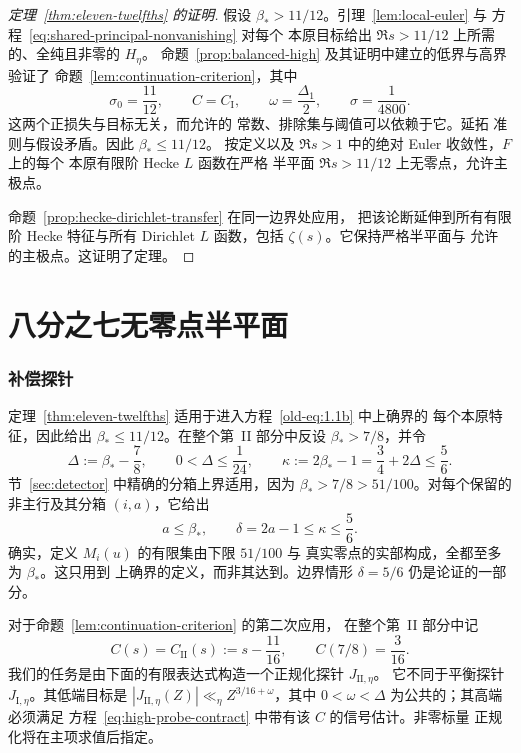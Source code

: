 \documentclass[11pt,a4paper]{article}
\numberwithin{equation}{section}
\numberwithin{figure}{section}
\theoremstyle{definition}
\theoremstyle{remark}
\begin{document}
\begin{proof}[定理~\ref{thm:eleven-twelfths} 的证明]
假设 $\beta_*>11/12$。引理~\ref{lem:local-euler} 与
方程~\eqref{eq:shared-principal-nonvanishing} 对每个
本原目标给出 $\Re s>11/12$ 上所需的、全纯且非零的 $H_\eta$。
命题~\ref{prop:balanced-high} 及其证明中建立的低界与高界验证了
命题~\ref{lem:continuation-criterion}，其中
\[
 \sigma_0=\frac{11}{12},\qquad C=C_{\mathrm I},\qquad
 \omega=\frac{\Delta_1}{2},\qquad \sigma=\frac1{4800}.
\]
这两个正损失与目标无关，而允许的
常数、排除集与阈值可以依赖于它。延拓
准则与假设矛盾。因此 $\beta_*\le11/12$。
按定义以及 $\Re s>1$ 中的绝对 Euler 收敛性，$F$ 上的每个
本原有限阶 Hecke $L$ 函数在严格
半平面 $\Re s>11/12$ 上无零点，允许主极点。

命题~\ref{prop:hecke-dirichlet-transfer} 在同一边界处应用，
把该论断延伸到所有有限阶 Hecke 特征与所有 Dirichlet
$L$ 函数，包括 $\zeta(s)$。它保持严格半平面与
允许的主极点。这证明了定理。
\end{proof}

\part{八分之七无零点半平面}
\label{part:seven-eighths}

\section{补偿探针}\label{sec:compensation}

定理~\ref{thm:eleven-twelfths} 适用于进入方程~\eqref{old-eq:1.1b} 中上确界的
每个本原特征，因此给出
$\beta_*\le11/12$。在整个第~II 部分中反设
$\beta_*>7/8$，并令
\begin{equation}\label{eq:part-II-bootstrap}
 \Delta:=\beta_*-\frac78,\qquad 0<\Delta\le\frac1{24},
 \qquad
 \kappa:=2\beta_*-1=\frac34+2\Delta\le\frac56.
\end{equation}
节~\ref{sec:detector} 中精确的分箱上界适用，因为
$\beta_*>7/8>51/100$。对每个保留的非主行及其分箱
$(i,a)$，它给出
\begin{equation}\label{eq:part-II-bin-ceiling}
 a\le\beta_*,\qquad \delta=2a-1\le\kappa\le\frac56.
\end{equation}
确实，定义 $M_i(u)$ 的有限集由下限 $51/100$ 与
真实零点的实部构成，全都至多为 $\beta_*$。这只用到
上确界的定义，而非其达到。边界情形
$\delta=5/6$ 仍是论证的一部分。

对于命题~\ref{lem:continuation-criterion} 的第二次应用，
在整个第~II 部分中记
\begin{equation}\label{eq:part-II-mellin-target}
 C(s)=C_{\mathrm{II}}(s):=s-\frac{11}{16},\qquad
 C(7/8)=\frac3{16}.
\end{equation}
我们的任务是由下面的有限表达式构造一个正规化探针 $J_{\mathrm{II},\eta}$。
它不同于平衡探针
$J_{\mathrm I,\eta}$。其低端目标是
$|J_{\mathrm{II},\eta}(Z)|\ll_\eta Z^{3/16+\omega}$，其中
$0<\omega<\Delta$ 为公共的；其高端必须满足
方程~\eqref{eq:high-probe-contract} 中带有该 $C$ 的信号估计。非零标量
正规化将在主项求值后指定。
\end{document}
